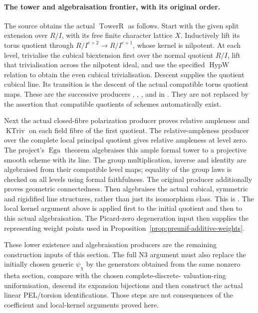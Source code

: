 \paragraph{The tower and algebraisation frontier, with its original order.}
The source obtains the actual \(\operatorname{TowerR}\) as follows.
Start with the given split extension over \(R/I\), with its free
finite character lattice \(X\).
Inductively lift its torus quotient through
\(R/I^{e+2}\to R/I^{e+1}\), whose kernel is nilpotent.
At each level, trivialise the cubical biextension first over the
normal quotient \(R/I\), lift that trivialisation across the
nilpotent ideal, and use the specified
\(\operatorname{HypW}\) relation to obtain the even cubical
trivialisation.  Descent supplies the quotient cubical line.
Its transition is the descent of the actual compatible torus
quotient maps.  These are the successive producers
, ,
, and  in
.
They are not replaced by the assertion that compatible
quotients of schemes automatically exist.

Next the actual closed-fibre polarization producer proves
relative ampleness and \(\operatorname{KTriv}\) on each
field fibre of the first quotient.  The relative-ampleness
producer over the complete local principal quotient gives
relative ampleness at level zero.
The project's \(\operatorname{Ega}\) theorem algebraises this
ample formal tower to a projective smooth scheme with its line.
The group multiplication, inverse and identity are algebraised
from their compatible level maps; equality of the group laws
is checked on all levels using formal faithfulness.
The original producer
 additionally proves
geometric connectedness.  Then
 algebraises the actual cubical, symmetric
and rigidified line structures, rather than just its isomorphism
class.
This is .
The local kernel argument above is applied first to the
initial quotient and then to this actual algebraisation.
The Picard-zero degeneration input then supplies the
representing weight points used in
Proposition~\ref{prop:preunif-additive-weights}.

These lower existence and algebraisation producers are the
remaining construction inputs of this section.  The full N3
argument must also replace the initially chosen generic
\(\psi_\chi\) by the generators obtained from the same nonzero
theta section, compare with the chosen complete-discrete-
valuation-ring uniformisation, descend its expansion
bijections and then construct the actual linear PEL/torsion
identifications.  Those steps are not consequences of the
coefficient and local-kernel arguments proved here.


